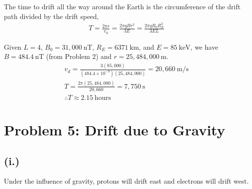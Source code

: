 \documentclass[11pt]{article}
\begin{document}
\hspace*{2em}The time to drift all the way around the Earth is the circumference of the drift path divided by the drift speed,
\begin{gather*}
T = \frac{2\pi r}{v_d} = \frac{2\pi qBr^2}{3E} = \frac{2\pi q B_0 R_E^2}{3EL}
\end{gather*}

\hspace*{2em}Given $L=4$, $B_0 = 31,000~\mathrm{nT}$, $R_E = 6371~\mathrm{km}$, and $E = 85~\mathrm{keV}$, we have $B = 484.4~\mathrm{nT}$ (from Problem 2) and $r = 25,484,000~\mathrm{m}$.
\begin{gather*}
v_d = \frac{3(85,000)}{(484.4\times10^{-9})(25,484,000)} = 20,660~\mathrm{m/s} \\
T = \frac{2\pi(25,484,000)}{20,660} = 7,750~\mathrm{s} \\
\boxed{\therefore T \approx 2.15~\mathrm{hours}}
\end{gather*}

\newpage
\section*{Problem 5: Drift due to Gravity}

\subsection*{(i.)}
\hspace*{2em}Under the influence of gravity, protons will drift east and electrons will drift west.
\end{document}
